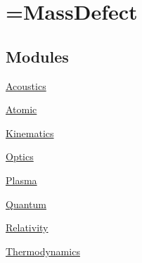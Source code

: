 \hypertarget{group___e_g_x_phys}{}\section{=Mass\+Defect}
\label{group___e_g_x_phys}
\subsection*{Modules}
\begin{DoxyCompactItemize}
\item 
\hyperlink{group___e_g_x_phys-_acoustics}{Acoustics}
\item 
\hyperlink{group___e_g_x_phys-_atomic}{Atomic}
\item 
\hyperlink{group___e_g_x_phys-_kinematics}{Kinematics}
\item 
\hyperlink{group___e_g_x_phys-_optics}{Optics}
\item 
\hyperlink{group___e_g_x_phys-_plasma}{Plasma}
\item 
\hyperlink{group___e_g_x_phys-_quantum}{Quantum}
\item 
\hyperlink{group___e_g_x_phys-_relativity}{Relativity}
\item 
\hyperlink{group___e_g_x_phys-_thermodynamics}{Thermodynamics}
\end{DoxyCompactItemize}
